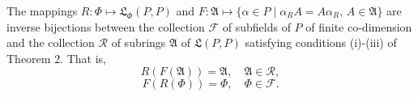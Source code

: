 The mappings $R: \Phi \mapsto \mathfrak{L}_\Phi(P, P)$ and $F: \mathfrak{A} \mapsto \{\alpha \in P \mid \alpha_R A = A \alpha_R, \, A \in \mathfrak{A}\}$ are inverse bijections between the collection $\mathcal{F}$ of subfields of $P$ of finite co-dimension and the collection $\mathcal{R}$ of subrings $\mathfrak{A}$ of $\mathfrak{L}(P, P)$ satisfying conditions (i)-(iii) of Theorem 2. That is,
$$R(F(\mathfrak{A})) = \mathfrak{A}, \quad \mathfrak{A} \in \mathcal{R},$$
$$F(R(\Phi)) = \Phi, \quad \Phi \in \mathcal{F}.$$
